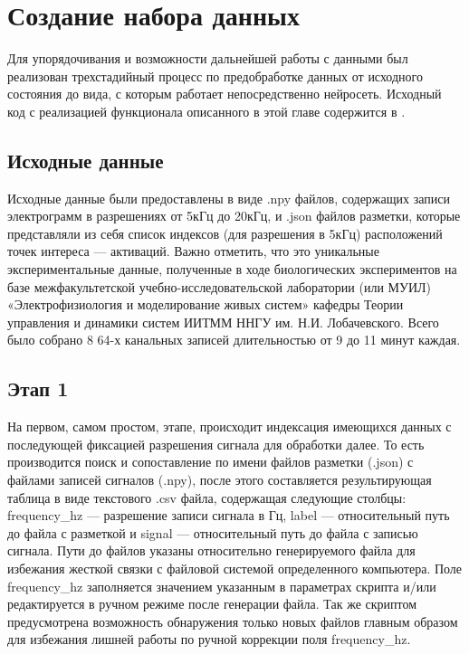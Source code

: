 \chapter{Создание набора данных}

Для упорядочивания и возможности дальнейшей работы с данными был реализован
трехстадийный процесс по предобработке данных от исходного состояния до вида, с
которым работает непосредственно нейросеть. Исходный код с реализацией
функционала описанного в этой главе содержится в \cite{egm-dataset-source}.


\section{Исходные данные}

Исходные данные были предоставлены в виде .npy файлов, содержащих записи
электрограмм в разрешениях от 5кГц до 20кГц, и .json файлов разметки, которые
представляли из себя список индексов (для разрешения в 5кГц) расположений точек
интереса --- активаций. Важно отметить, что это уникальные экспериментальные
данные, полученные в ходе биологических экспериментов на базе межфакультетской
учебно-исследовательской лаборатории (или МУИЛ) «Электрофизиология и
моделирование живых систем» кафедры Теории управления и динамики систем ИИТММ
ННГУ им. Н.И. Лобачевского. Всего было собрано 8 64-х канальных записей
длительностью от 9 до 11 минут каждая.

\section{Этап 1}

На первом, самом простом, этапе, происходит индексация имеющихся данных с
последующей фиксацией разрешения сигнала для обработки далее. То есть
производится поиск и сопоставление по имени файлов разметки (.json) с файлами
записей сигналов (.npy), после этого составляется результирующая таблица в виде
текстового .csv файла, содержащая следующие столбцы: frequency\_hz ---
разрешение записи сигнала в Гц, label --- относительный путь до файла с
разметкой и signal --- относительный путь до файла с записью сигнала. Пути до
файлов указаны относительно генерируемого файла для избежания жесткой связки с
файловой системой определенного компьютера. Поле frequency\_hz заполняется
значением указанным в параметрах скрипта и/или редактируется в ручном режиме
после генерации файла. Так же скриптом предусмотрена возможность обнаружения
только новых файлов главным образом для избежания лишней работы по ручной
коррекции поля frequency\_hz.

